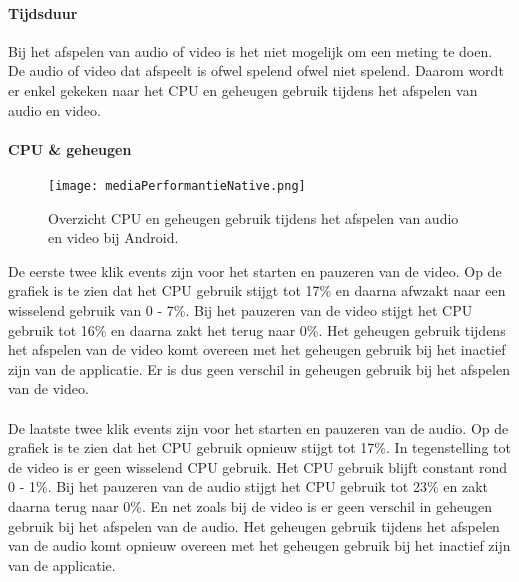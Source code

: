 \paragraph{Tijdsduur}
Bij het afspelen van audio of video is het niet mogelijk om een meting te doen. 
De audio of video dat afspeelt is ofwel spelend ofwel niet spelend.
Daarom wordt er enkel gekeken naar het CPU en geheugen gebruik tijdens 
het afspelen van audio en video.

\paragraph{CPU \& geheugen}
\begin{figure}[H]
    \centering
    \texttt{[image: mediaPerformantieNative.png]}
    \caption{Overzicht CPU en geheugen gebruik tijdens het afspelen van audio en video bij Android.}
\end{figure}
De eerste twee klik events zijn voor het starten en pauzeren van de video. Op de grafiek 
is te zien dat het CPU gebruik stijgt tot 17\% en daarna afwzakt naar een wisselend gebruik 
van 0 - 7\%. Bij het pauzeren van de video stijgt het CPU gebruik tot 16\% en daarna
zakt het terug naar 0\%. Het geheugen gebruik tijdens het afspelen van de video komt overeen 
met het geheugen gebruik bij het inactief zijn van de applicatie. Er is dus geen verschil in
geheugen gebruik bij het afspelen van de video.
\\\\
De laatste twee klik events zijn voor het starten en pauzeren van de audio. Op de grafiek
is te zien dat het CPU gebruik opnieuw stijgt tot 17\%. In tegenstelling tot de video is 
er geen wisselend CPU gebruik. Het CPU gebruik blijft constant rond 0 - 1\%. Bij het pauzeren
van de audio stijgt het CPU gebruik tot 23\% en zakt daarna terug naar 0\%. En net zoals bij de 
video is er geen verschil in geheugen gebruik bij het afspelen van de audio. Het geheugen gebruik
tijdens het afspelen van de audio komt opnieuw overeen met het geheugen gebruik bij het inactief zijn van
de applicatie.